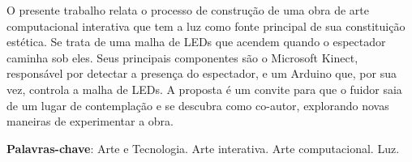 \begin{RESUMO}
\thispagestyle{empty}
	\begin{SingleSpace}
	
		\hspace{-1.3 cm}O presente trabalho relata o processo de construção de uma obra de arte computacional interativa que tem a luz como fonte principal de sua constituição estética. Se trata de uma malha de LEDs que acendem quando o espectador caminha sob eles. Seus principais componentes são o Microsoft Kinect, responsável por detectar a presença do espectador, e um Arduino que, por sua vez, controla a malha de LEDs.  A proposta é um convite para que o fuidor saia de um lugar de contemplação e se descubra como co-autor, explorando novas maneiras de experimentar a obra. 
		 
		
		\vspace*{0.5cm}\hspace{-1.3 cm}\textbf{Palavras-chave}: Arte e Tecnologia. Arte interativa. Arte computacional. Luz.
		
	\end{SingleSpace}
\end{RESUMO}


